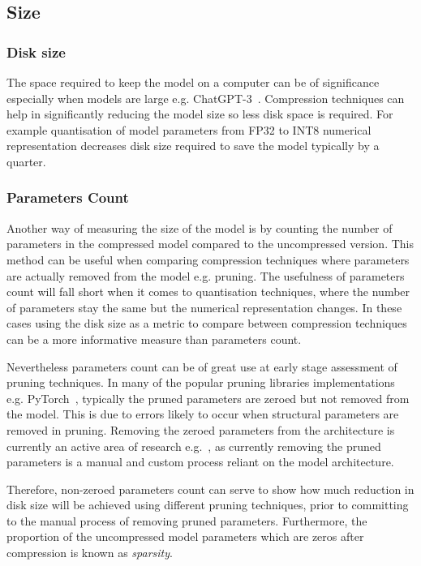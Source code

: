 \subsection{Size}
\subsubsection{Disk size}
The space required to keep the model on a computer can be of significance especially when models are large e.g. ChatGPT-3~\cite{Brown2020}. Compression techniques can help in significantly reducing the model size so less disk space is required. For example quantisation of model parameters from FP32 to INT8 numerical representation decreases disk size required to save the model typically by a quarter. 
%




 

\subsubsection{Parameters Count}
Another way of measuring the size of the model is by counting the number of parameters in the compressed model compared to the uncompressed version. This method can be useful when comparing compression techniques where parameters are actually removed from the model e.g. pruning. 
%
The usefulness of parameters count will fall short when it comes to quantisation techniques, where the number of parameters stay the same but the numerical representation changes.
In these cases using the disk size as a metric to compare between compression techniques can be a more informative measure than parameters count.

Nevertheless parameters count can be of great use at early stage assessment of pruning techniques.
%
In many of the popular pruning libraries implementations e.g. PyTorch~\cite{paszke2017automatic}, typically the pruned parameters are zeroed but not removed from the model.
%
This is due to errors likely to occur when structural parameters are removed in pruning. Removing the zeroed parameters from the architecture is currently an active area of research e.g.~\cite{fang2023depgraph}, as currently removing the pruned parameters is a manual and custom process reliant on the model architecture. 

Therefore, non-zeroed parameters count can serve to show how much reduction in disk size will be achieved using different pruning techniques, prior to committing to the manual process of removing pruned parameters. 
%
Furthermore, the proportion of the uncompressed model parameters which are zeros after compression is known as \textit{sparsity}.

